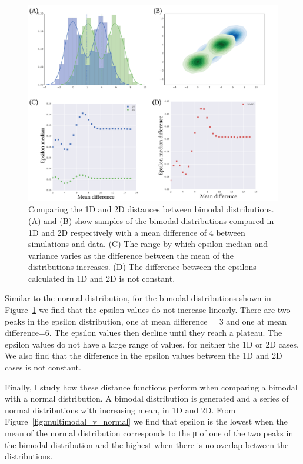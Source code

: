 \begin{figure}[tb]
\centering
\includegraphics[scale=0.7]{../../chapters/chapterABCFlow/images/multimodal_musd.png}
\caption[LoF caption]{\label{fig:multimodal_musd}Comparing the 1D and 2D distances between bimodal distributions. (A) and (B) show samples of the bimodal distributions compared in 1D and 2D respectively with a mean difference of 4 between simulations and data. (C) The range by which epsilon median and variance varies as the difference between the mean of the distributions increases. (D) The difference between the epsilons calculated in 1D and 2D is not constant.}

\end{figure}

Similar to the normal distribution, for the bimodal distributions shown in Figure~\ref{fig:multimodal_musd} we find that the epsilon values do not increase linearly. There are two peaks in the epsilon distribution, one at mean difference = 3 and one at mean difference=6. The epsilon values then decline until they reach a plateau. The epsilon values do not have a large range of values, for neither the 1D or 2D cases. We also find that the difference in the epsilon values between the 1D and 2D cases is not constant. 

Finally, I study how these distance functions perform when comparing a bimodal with a normal distribution. A bimodal distribution is generated and a series of normal distributions with increasing mean, in 1D and 2D. From Figure~\ref{fig:multimodal_v_normal} we find that epsilon is the lowest when the mean of the normal distribution corresponds to the μ of one of the two peaks in the bimodal distribution and the highest when there is no overlap between the distributions.



